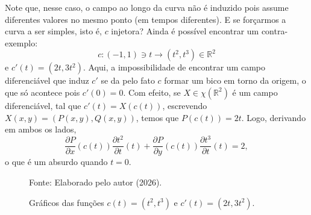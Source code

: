 Note que, nesse caso, o campo ao longo da curva não é induzido pois assume diferentes valores no mesmo ponto (em tempos diferentes). E se forçarmos a curva a ser simples, isto é, $c$ injetora? Ainda é possível encontrar um contra-exemplo:
\begin{equation*}
    c:(-1, 1) \ni t \to (t^{2},t^{3}) \in \mathbb{R}^{2}
\end{equation*}
e $c'(t)=(2t, 3t^{2})$.
Aqui, a impossibilidade de encontrar um campo diferenciável que induz $c'$ se da pelo fato $c$ formar um bico em torno da origem, o que só acontece pois $c'(0)=0$. Com efeito, se $X \in \chi(\mathbb{R}^{2})$ é um campo diferenciável, tal que $c'(t)=X(c(t))$, escrevendo $X(x,y)=(P(x,y),Q(x,y))$, temos que $P(c(t))=2t$. Logo, derivando em ambos os lados,
\begin{equation*}
    \frac{\partial P}{\partial x}(c(t))\frac{\partial t^{2}}{\partial t}(t) + \frac{\partial P}{\partial y}(c(t))\frac{\partial t^{3}}{\partial t}(t)=2,
\end{equation*}
o que é um absurdo quando $t=0$.

\begin{figure}[htbp]
    \centering
    \caption{Gráficos das funções $c(t)=(t^{2},t^{3})$ e $c'(t)=(2t,3t^{2})$.}

    

    \vspace{6pt}
    \small Fonte: Elaborado pelo autor (2026).
    \label{fig:graficos_funcoes}
\end{figure}

